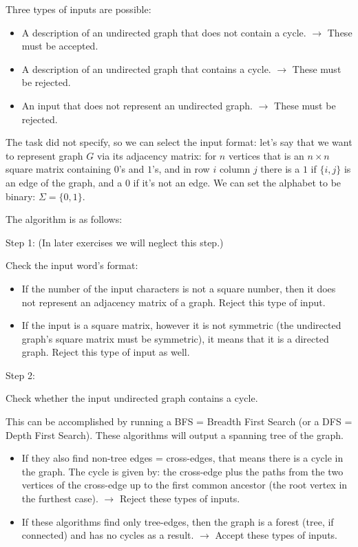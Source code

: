 Three types of inputs are possible:
\begin{itemize}
    \item A description of an undirected graph that does not contain a cycle. $\rightarrow$ These must be accepted.
    \item A description of an undirected graph that contains a cycle. $\rightarrow$ These must be rejected.
    \item An input that does not represent an undirected graph. $\rightarrow$ These must be rejected.
\end{itemize}

The task did not specify, so we can select the input format: let's say that we want to represent graph $G$ via its adjacency matrix: for $n$ vertices that is an $n \times n$ square matrix containing $0$'s and $1$'s, and in row $i$ column $j$ there is a $1$ if $\{i,j\}$ is an edge of the graph, and a $0$ if it's not an edge. We can set the alphabet to be binary: $\Sigma = \{0,1\}$.

The algorithm is as follows:

Step 1: (In later exercises we will neglect this step.)

Check the input word's format:

\begin{itemize}
    \item If the number of the input characters is not a square number, then it does not represent an adjacency matrix of a graph. Reject this type of input.
    \item If the input is a square matrix, however it is not symmetric (the undirected graph's square matrix must be symmetric), it means that it is a directed graph. Reject this type of input as well.
\end{itemize}

Step 2:

Check whether the input undirected graph contains a cycle.

This can be accomplished by running a BFS = Breadth First Search (or a DFS = Depth First Search). These algorithms will output a spanning tree of the graph.

\begin{itemize}
    \item If they also find non-tree edges = cross-edges, that means there is a cycle in the graph. The cycle is given by: the cross-edge plus the paths from the two vertices of the cross-edge up to the first common ancestor (the root vertex in the furthest case). $\rightarrow$ Reject these types of inputs.
    \item If these algorithms find only tree-edges, then the graph is a forest (tree, if connected) and has no cycles as a result. $\rightarrow$ Accept these types of inputs.
\end{itemize}

